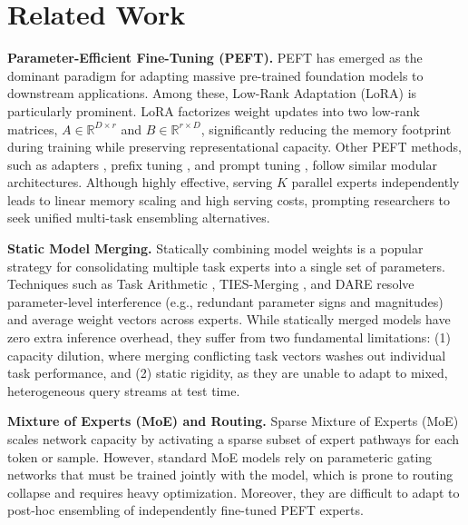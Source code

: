 \section{Related Work}
\label{sec:related_work}

\textbf{Parameter-Efficient Fine-Tuning (PEFT).} PEFT has emerged as the dominant paradigm for adapting massive pre-trained foundation models to downstream applications. Among these, Low-Rank Adaptation (LoRA) \cite{hu2021lora} is particularly prominent. LoRA factorizes weight updates into two low-rank matrices, $A \in \mathbb{R}^{D \times r}$ and $B \in \mathbb{R}^{r \times D}$, significantly reducing the memory footprint during training while preserving representational capacity. Other PEFT methods, such as adapters \cite{houlsby2019parameter}, prefix tuning \cite{li2021prefix}, and prompt tuning \cite{lester2021power}, follow similar modular architectures. Although highly effective, serving $K$ parallel experts independently leads to linear memory scaling and high serving costs, prompting researchers to seek unified multi-task ensembling alternatives.

\textbf{Static Model Merging.} Statically combining model weights is a popular strategy for consolidating multiple task experts into a single set of parameters. Techniques such as Task Arithmetic \cite{ilharco2022editing}, TIES-Merging \cite{yadav2023ties}, and DARE \cite{dares2023} resolve parameter-level interference (e.g., redundant parameter signs and magnitudes) and average weight vectors across experts. While statically merged models have zero extra inference overhead, they suffer from two fundamental limitations: (1) capacity dilution, where merging conflicting task vectors washes out individual task performance, and (2) static rigidity, as they are unable to adapt to mixed, heterogeneous query streams at test time.

\textbf{Mixture of Experts (MoE) and Routing.} Sparse Mixture of Experts (MoE) \cite{shazeer2017outrageously, fedus2022switch} scales network capacity by activating a sparse subset of expert pathways for each token or sample. However, standard MoE models rely on parameteric gating networks that must be trained jointly with the model, which is prone to routing collapse and requires heavy optimization. Moreover, they are difficult to adapt to post-hoc ensembling of independently fine-tuned PEFT experts.

